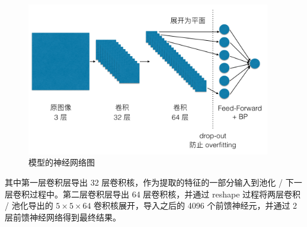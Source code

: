 \documentclass[UTF8]{ctexart}
\begin{document}
\begin{figure}[htbp]
  \centering
  \includegraphics[width=0.95\textwidth]{../reference/convolution.png}
  \caption{模型的神经网络图}
  \label{fig:shapes0}
\end{figure}

其中第一层卷积层导出 32 层卷积核，作为提取的特征的一部分输入到池化 / 下一层卷积过程中。第二层卷积层导出 64 层卷积核，并通过 reshape 过程将两层卷积 / 池化导出的 $5 \times 5 \times 64$ 卷积核展开，导入之后的 4096 个前馈神经元，并通过 2 层前馈神经网络得到最终结果。
\end{document}
